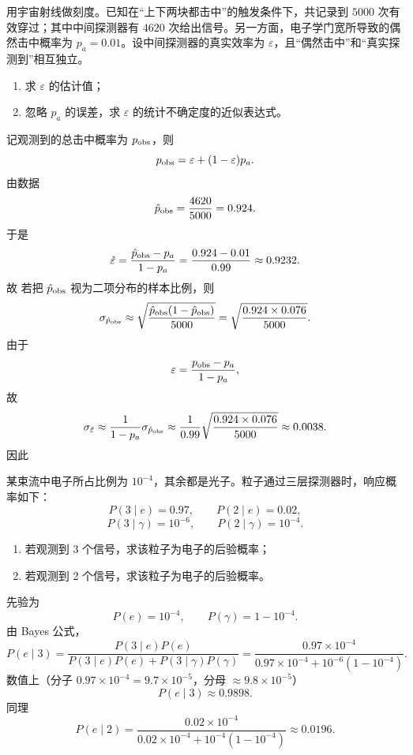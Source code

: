 \begin{question}
用宇宙射线做刻度。已知在“上下两块都击中”的触发条件下，共记录到 $5000$ 次有效穿过；其中中间探测器有 $4620$ 次给出信号。另一方面，电子学门宽所导致的偶然击中概率为 $p_a=0.01$。设中间探测器的真实效率为 $\varepsilon$，且“偶然击中”和“真实探测到”相互独立。
\begin{enumerate}[label=(\alph*),leftmargin=2.8em,itemsep=0.2em]
\item 求 $\varepsilon$ 的估计值；
\item 忽略 $p_a$ 的误差，求 $\varepsilon$ 的统计不确定度的近似表达式。
\end{enumerate}
\begin{solution}
记观测到的总击中概率为 $p_{\rm obs}$，则
\[
p_{\rm obs}=\varepsilon+(1-\varepsilon)p_a.
\]
由数据
\[
\hat p_{\rm obs}=\frac{4620}{5000}=0.924.
\]
于是
\[
\hat\varepsilon=\frac{\hat p_{\rm obs}-p_a}{1-p_a}
=\frac{0.924-0.01}{0.99}
\approx 0.9232.
\]
故
若把 $\hat p_{\rm obs}$ 视为二项分布的样本比例，则
\[
\sigma_{\hat p_{\rm obs}}\approx \sqrt{\frac{\hat p_{\rm obs}(1-\hat p_{\rm obs})}{5000}}
=\sqrt{\frac{0.924\times 0.076}{5000}}.
\]
由于
\[
\varepsilon=\frac{p_{\rm obs}-p_a}{1-p_a},
\]
故
\[
\sigma_{\hat\varepsilon}\approx \frac{1}{1-p_a}\sigma_{\hat p_{\rm obs}}
\approx \frac{1}{0.99}\sqrt{\frac{0.924\times 0.076}{5000}}
\approx 0.0038.
\]
因此
\end{solution}
\end{question}

\begin{question}
某束流中电子所占比例为 $10^{-4}$，其余都是光子。粒子通过三层探测器时，响应概率如下：
\[
P(3\mid e)=0.97,\qquad P(2\mid e)=0.02,
\]
\[
P(3\mid \gamma)=10^{-6},\qquad P(2\mid \gamma)=10^{-4}.
\]
\begin{enumerate}[label=(\alph*),leftmargin=2.8em,itemsep=0.2em]
\item 若观测到 3 个信号，求该粒子为电子的后验概率；
\item 若观测到 2 个信号，求该粒子为电子的后验概率。
\end{enumerate}
\begin{solution}
先验为
\[
P(e)=10^{-4},\qquad P(\gamma)=1-10^{-4}.
\]
由 Bayes 公式，
\[
P(e\mid 3)=\frac{P(3\mid e)P(e)}{P(3\mid e)P(e)+P(3\mid \gamma)P(\gamma)}
=\frac{0.97\times 10^{-4}}{0.97\times 10^{-4}+10^{-6}(1-10^{-4})}.
\]
数值上（分子 $0.97\times10^{-4}=9.7\times10^{-5}$，分母 $\approx9.8\times10^{-5}$）
\[
P(e\mid 3)\approx 0.9898.
\]
同理
\[
P(e\mid 2)=\frac{0.02\times 10^{-4}}{0.02\times 10^{-4}+10^{-4}(1-10^{-4})}
\approx 0.0196.
\]
\end{solution}
\end{question}

